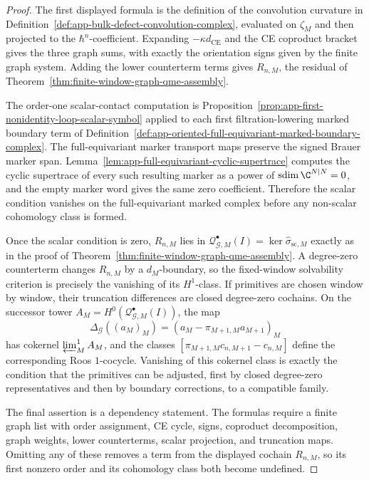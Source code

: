 \begin{proof}
  The first displayed formula is the definition of the convolution
  curvature in
  Definition~\ref{def:app-bulk-defect-convolution-complex}, evaluated on
  \(\zeta_M\) and then projected to the \(\hbar^n\)-coefficient.  Expanding
  \(-\kappa d_{\mathrm{CE}}\) and the CE coproduct bracket gives the
  three graph sums, with exactly the orientation signs given by the
  finite graph system.  Adding the lower counterterm terms gives
  \(R_{n,M}\), the residual of
  Theorem~\ref{thm:finite-window-graph-qme-assembly}.

  The order-one scalar-contact computation is
  Proposition~\ref{prop:app-first-nonidentity-loop-scalar-symbol} applied
  to each first filtration-lowering marked boundary term of
  Definition~\ref{def:app-oriented-full-equivariant-marked-boundary-complex}.
  The full-equivariant marker transport maps preserve the signed Brauer
  marker span.  Lemma~\ref{lem:app-full-equivariant-cyclic-supertrace}
  computes the cyclic supertrace of every such resulting marker as a power
  of \(\operatorname{sdim}\C^{N|N}=0\), and the empty marker word gives the
  same zero coefficient.  Therefore the scalar condition vanishes on the
  full-equivariant marked complex before any non-scalar cohomology class
  is formed.

  Once the scalar condition is zero, \(R_{n,M}\) lies in
  \(\mathcal Q^\bullet_{\mathcal G,M}(I)=
  \ker\widehat\sigma_{\mathrm{sc},M}\) exactly as in the proof of
  Theorem~\ref{thm:finite-window-graph-qme-assembly}.  A degree-zero
  counterterm changes \(R_{n,M}\) by a \(d_M\)-boundary, so the
  fixed-window solvability criterion is precisely the vanishing of its
  \(H^1\)-class.  If primitives are chosen window by window, their
  truncation differences are closed degree-zero cochains.  On the
  successor tower \(A_M=H^0(\mathcal Q^\bullet_{\mathcal G,M}(I))\), the
  map
  \[
    \Delta_{\mathcal G}((a_M)_M)
      =
    (a_M-\pi_{M+1,M}a_{M+1})_M
  \]
  has cokernel \(\varprojlim^1_MA_M\), and the classes
  \([\pi_{M+1,M}c_{n,M+1}-c_{n,M}]\) define the corresponding Roos
  \(1\)-cocycle.  Vanishing of this cokernel class is exactly the
  condition that the primitives can be adjusted, first by closed
  degree-zero representatives and then by boundary corrections, to a
  compatible family.

  The final assertion is a dependency statement.  The formulas require a
  finite graph list with order assignment, CE cycle, signs, coproduct
  decomposition, graph weights, lower counterterms, scalar projection, and
  truncation maps.  Omitting any of these removes a term from the displayed
  cochain \(R_{n,M}\), so its first nonzero order and its cohomology class
  both become undefined.
\end{proof}


